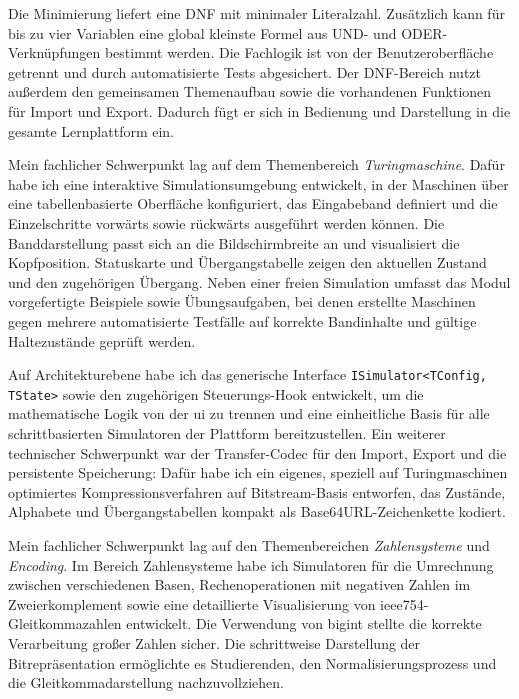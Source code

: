Die Minimierung liefert eine DNF mit minimaler Literalzahl. Zusätzlich kann für bis zu
vier Variablen eine global kleinste Formel aus UND- und ODER-Verknüpfungen bestimmt
werden. Die Fachlogik ist von der Benutzeroberfläche getrennt und durch automatisierte
Tests abgesichert. Der DNF-Bereich nutzt außerdem den gemeinsamen Themenaufbau sowie die
vorhandenen Funktionen für Import und Export. Dadurch fügt er sich in Bedienung und
Darstellung in die gesamte Lernplattform ein.

Mein fachlicher Schwerpunkt lag auf dem Themenbereich \emph{Turingmaschine}. Dafür habe ich eine interaktive Simulationsumgebung entwickelt, in der Maschinen über eine tabellenbasierte Oberfläche konfiguriert, das Eingabeband definiert und die Einzelschritte vorwärts sowie rückwärts ausgeführt werden können. Die Banddarstellung passt sich an die Bildschirmbreite an und visualisiert die Kopfposition. Statuskarte und Übergangstabelle zeigen den aktuellen Zustand und den zugehörigen Übergang. Neben einer freien Simulation umfasst das Modul vorgefertigte Beispiele sowie Übungsaufgaben, bei denen erstellte Maschinen gegen mehrere automatisierte Testfälle auf korrekte Bandinhalte und gültige Haltezustände geprüft werden.

Auf Architekturebene habe ich das generische Interface \verb|ISimulator<TConfig, TState>| sowie den zugehörigen Steuerungs-Hook entwickelt, um die mathematische Logik von der \gls{ui} zu trennen und eine einheitliche Basis für alle schrittbasierten Simulatoren der Plattform bereitzustellen. Ein weiterer technischer Schwerpunkt war der Transfer-Codec für den Import, Export und die persistente Speicherung: Dafür habe ich ein eigenes, speziell auf Turingmaschinen optimiertes Kompressionsverfahren auf Bitstream-Basis entworfen, das Zustände, Alphabete und Übergangstabellen kompakt als Base64URL-Zeichenkette kodiert.

Mein fachlicher Schwerpunkt lag auf den Themenbereichen \emph{Zahlensysteme} und \emph{Encoding}. Im Bereich Zahlensysteme habe ich Simulatoren für die Umrechnung zwischen verschiedenen Basen, Rechenoperationen mit negativen Zahlen im Zweierkomplement sowie eine detaillierte Visualisierung von \gls{ieee754}-Gleitkommazahlen entwickelt. Die Verwendung von \gls{bigint} stellte die korrekte Verarbeitung großer Zahlen sicher. Die schrittweise Darstellung der Bitrepräsentation ermöglichte es Studierenden, den Normalisierungsprozess und die Gleitkommadarstellung nachzuvollziehen.

